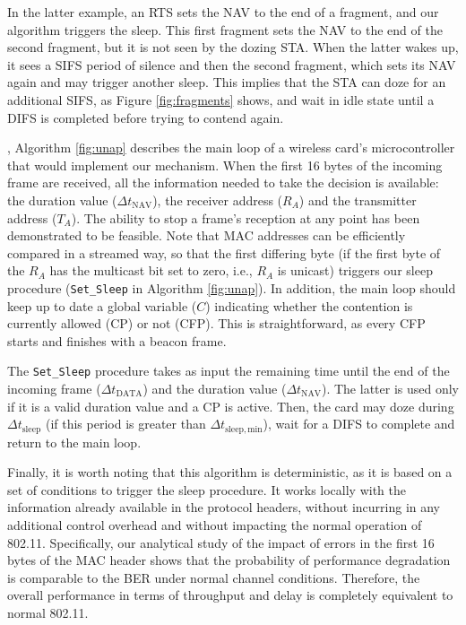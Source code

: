\documentclass[twoside,nohyper]{tufte-book}
\theoremstyle{definition}
\theoremstyle{definition}
\theoremstyle{definition}
\theoremstyle{remark}
\begin{document}
In the latter example, an RTS sets the NAV to the end of a fragment, and
our algorithm triggers the sleep. This first fragment sets the NAV to
the end of the second fragment, but it is not seen by the dozing STA.
When the latter wakes up, it sees a SIFS period of silence and then the
second fragment, which sets its NAV again and may trigger another sleep.
This implies that the STA can doze for an additional SIFS, as Figure
\ref{fig:fragments} shows, and wait in idle state until a DIFS is
completed before trying to contend again.

, Algorithm \ref{fig:unap} describes the
main loop of a wireless card's microcontroller that would implement our
mechanism. When the first 16 bytes of the incoming frame are received,
all the information needed to take the decision is available: the
duration value (\(\Delta t_\mathrm{NAV}\)), the receiver address
(\(R_A\)) and the transmitter address (\(T_A\)). The ability to stop a
frame's reception at any point has been demonstrated to be
feasible\cite[0pt]{berger2014}.
Note that MAC addresses can be efficiently compared in a streamed way,
so that the first differing byte (if the first byte of the \(R_A\) has
the multicast bit set to zero, i.e., \(R_A\) is unicast) triggers our
sleep procedure (\texttt{Set\_Sleep} in Algorithm \ref{fig:unap}). In
addition, the main loop should keep up to date a global variable (\(C\))
indicating whether the contention is currently allowed (CP) or not
(CFP). This is straightforward, as every CFP starts and finishes with a
beacon frame.

The \texttt{Set\_Sleep} procedure takes as input the remaining time
until the end of the incoming frame (\(\Delta t_\mathrm{DATA}\)) and the
duration value (\(\Delta t_\mathrm{NAV}\)). The latter is used only if
it is a valid duration value and a CP is active. Then, the card may doze
during \(\Delta t_\mathrm{sleep}\) (if this period is greater than
\(\Delta t_\mathrm{sleep,min}\)), wait for a DIFS to complete and return
to the main loop.

Finally, it is worth noting that this algorithm is deterministic, as it
is based on a set of conditions to trigger the sleep procedure. It works
locally with the information already available in the protocol headers,
without incurring in any additional control overhead and without
impacting the normal operation of 802.11. Specifically, our analytical
study of the impact of errors in the first 16 bytes of the MAC header
shows that the probability of performance degradation is comparable to
the BER under normal channel conditions. Therefore, the overall
performance in terms of throughput and delay is completely equivalent to
normal 802.11.
\end{document}
